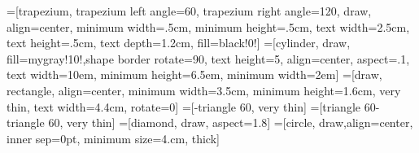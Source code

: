                     
                    

=[trapezium, trapezium left angle=60, trapezium right angle=120, draw, align=center, minimum width=.5cm, minimum height=.5cm, text width=2.5cm, text height=.5cm, text depth=1.2cm, fill=black!0!]
=[cylinder, draw, fill=mygray!10!,shape border rotate=90, text height=5, align=center, aspect=.1, text width=10em, minimum height=6.5em, minimum width=2em]
=[draw, rectangle, align=center, minimum width=3.5cm, minimum height=1.6cm, very thin, text width=4.4cm, rotate=0]
=[-triangle 60, very thin]
=[triangle 60-triangle 60, very thin]
=[diamond, draw, aspect=1.8]
=[circle, draw,align=center,  inner sep=0pt, minimum size=4.cm, thick]